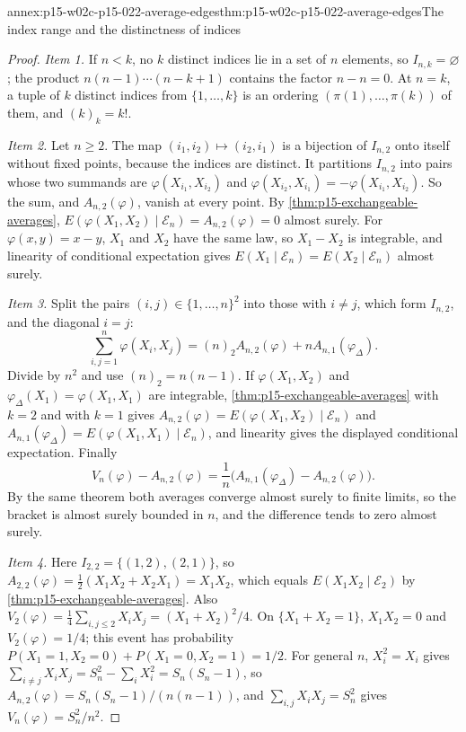 \begin{annexitem}{annex:p15-w02c-p15-022-average-edges}{thm:p15-w02c-p15-022-average-edges}{The index range and the distinctness of indices}
\begin{proof}
\emph{Item 1.} If \(n<k\), no \(k\) distinct indices lie in a set of
\(n\) elements, so \(I_{n,k}=\varnothing\); the product
\(n(n-1)\cdots(n-k+1)\) contains the factor \(n-n=0\). At \(n=k\), a
tuple of \(k\) distinct indices from \(\{1,\ldots,k\}\) is an ordering
\((\pi(1),\ldots,\pi(k))\) of them, and \((k)_k=k!\).

\emph{Item 2.} Let \(n\geq2\). The map \((i_1,i_2)\mapsto(i_2,i_1)\) is a
bijection of \(I_{n,2}\) onto itself without fixed points, because the
indices are distinct. It partitions \(I_{n,2}\) into pairs whose two
summands are \(\varphi(X_{i_1},X_{i_2})\) and
\(\varphi(X_{i_2},X_{i_1})=-\varphi(X_{i_1},X_{i_2})\). So the sum, and
\(A_{n,2}(\varphi)\), vanish at every point. By
\cref{thm:p15-exchangeable-averages},
\(E(\varphi(X_1,X_2)\mid\mathcal E_n)=A_{n,2}(\varphi)=0\) almost surely.
For \(\varphi(x,y)=x-y\), \(X_1\) and \(X_2\) have the same law, so
\(X_1-X_2\) is integrable, and linearity of conditional expectation
gives \(E(X_1\mid\mathcal E_n)=E(X_2\mid\mathcal E_n)\) almost surely.

\emph{Item 3.} Split the pairs \((i,j)\in\{1,\ldots,n\}^2\) into those
with \(i\neq j\), which form \(I_{n,2}\), and the diagonal \(i=j\):
\[
 \sum_{i,j=1}^n\varphi(X_i,X_j)
   =(n)_2A_{n,2}(\varphi)+nA_{n,1}(\varphi_\Delta).
\]
Divide by \(n^2\) and use \((n)_2=n(n-1)\). If \(\varphi(X_1,X_2)\) and
\(\varphi_\Delta(X_1)=\varphi(X_1,X_1)\) are integrable,
\cref{thm:p15-exchangeable-averages} with \(k=2\) and with \(k=1\) gives
\(A_{n,2}(\varphi)=E(\varphi(X_1,X_2)\mid\mathcal E_n)\) and
\(A_{n,1}(\varphi_\Delta)=E(\varphi(X_1,X_1)\mid\mathcal E_n)\), and
linearity gives the displayed conditional expectation. Finally
\[
 V_n(\varphi)-A_{n,2}(\varphi)
   =\frac1n\bigl(A_{n,1}(\varphi_\Delta)-A_{n,2}(\varphi)\bigr).
\]
By the same theorem both averages converge almost surely to finite
limits, so the bracket is almost surely bounded in \(n\), and the
difference tends to zero almost surely.

\emph{Item 4.} Here \(I_{2,2}=\{(1,2),(2,1)\}\), so
\(A_{2,2}(\varphi)=\tfrac12(X_1X_2+X_2X_1)=X_1X_2\), which equals
\(E(X_1X_2\mid\mathcal E_2)\) by
\cref{thm:p15-exchangeable-averages}. Also
\(V_2(\varphi)=\tfrac14\sum_{i,j\leq2}X_iX_j=(X_1+X_2)^2/4\). On
\(\{X_1+X_2=1\}\), \(X_1X_2=0\) and \(V_2(\varphi)=1/4\); this event has
probability \(P(X_1=1,X_2=0)+P(X_1=0,X_2=1)=1/2\). For general \(n\),
\(X_i^2=X_i\) gives
\(\sum_{i\neq j}X_iX_j=S_n^2-\sum_iX_i^2=S_n(S_n-1)\), so
\(A_{n,2}(\varphi)=S_n(S_n-1)/(n(n-1))\), and
\(\sum_{i,j}X_iX_j=S_n^2\) gives \(V_n(\varphi)=S_n^2/n^2\).
\end{proof}
\end{annexitem}

